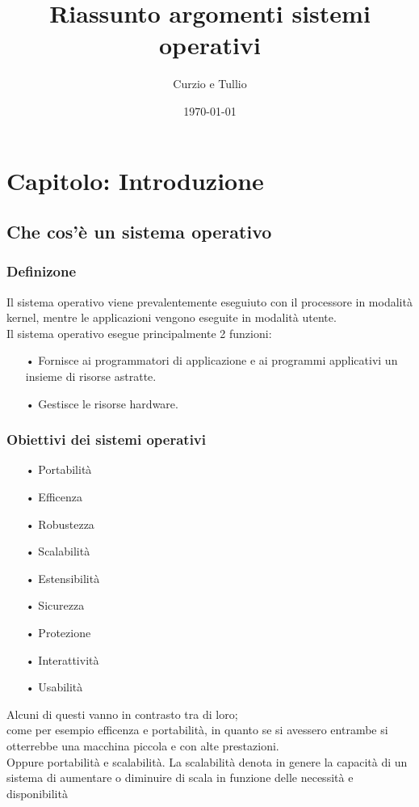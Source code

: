 \documentclass{article}
\title{Riassunto argomenti sistemi operativi}
\author{Curzio e Tullio}
\date{\today}
\begin{document}
\maketitle
\tableofcontents

\section{Capitolo: Introduzione}
\subsection{Che cos'è un sistema operativo}
\subsubsection{Definizone}
Il sistema operativo viene prevalentemente eseguiuto con il processore in modalità kernel, mentre le applicazioni vengono eseguite in modalità utente.\\
Il sistema operativo esegue principalmente 2 funzioni:
\begin{enumerate}
   \item[•] Fornisce ai programmatori di applicazione e ai programmi applicativi un insieme di risorse astratte.
   \item[•] Gestisce le risorse hardware.
\end{enumerate}
\subsubsection{Obiettivi dei sistemi operativi}
\begin{enumerate}
   \item[•] Portabilità
   \item[•] Efficenza
   \item[•] Robustezza
   \item[•] Scalabilità
   \item[•] Estensibilità
   \item[•] Sicurezza 
   \item[•] Protezione 
   \item[•] Interattività
   \item[•] Usabilità
\end{enumerate}
Alcuni di questi vanno in contrasto tra di loro;
\\come per esempio efficenza e portabilità, in quanto se si avessero entrambe si otterrebbe una macchina piccola e con alte prestazioni.
\\Oppure portabilità e scalabilità. La scalabilità denota in genere la capacità di un sistema di aumentare o diminuire di scala in funzione delle necessità e disponibilità
\end{document}
